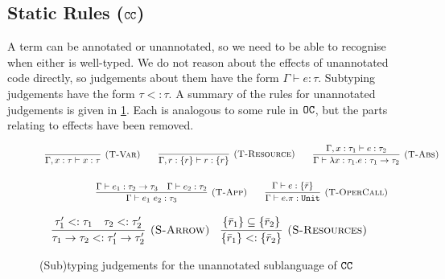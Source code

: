 \subsection{Static Rules ($\mathtt{CC}$)}

A term can be annotated or unannotated, so we need to be able to recognise when either is well-typed. We do not reason about the effects of unannotated code directly, so judgements about them have the form $\Gamma \vdash e: \tau$. Subtyping judgements have the form $\tau <: \tau$. A summary of the rules for unannotated judgements is given in \ref{fig:unannotated_static_rules}. Each is analogous to some rule in $\mathtt{OC}$, but the parts relating to effects have been removed.

\begin{figure}[h]
\vspace{-5pt}



\[
\begin{array}{c}


\infer[\textsc{(T-Var)}]
	{\Gamma, x: \tau \vdash x: \tau}
	{}
~~~~~~
\infer[\textsc{(T-Resource)}]
	{\Gamma, r: \{ r \} \vdash r : \{ r \}}
	{}

~~~~~~
\infer[\textsc{(T-Abs)}]
	{\Gamma \vdash \lambda x: \tau_1.e : \tau_1 \rightarrow \tau_2}
	{\Gamma, x: \tau_1 \vdash e: \tau_2}\\[4ex]
	
\infer[\textsc{(T-App)}]
	{\Gamma \vdash e_1~e_2: \tau_3}
	{\Gamma \vdash e_1: \tau_2 \rightarrow \tau_3 & \Gamma \vdash e_2: \tau_2}
~~~~~~
\infer[\textsc{(T-OperCall)}]
	{\Gamma \vdash e.\pi: \kwa{Unit}}
	{\Gamma \vdash e: \{ \bar r \}}

\end{array}
\]



\fbox{$\tau <: \tau$}

\[
\begin{array}{c}

\infer[\textsc{(S-Arrow)}]
	{ \tau_1 \rightarrow \tau_2 <: \tau_1' \rightarrow \tau_2' }
	{ \tau_1' <: \tau_1 & \tau_2 <: \tau_2' }
	~~~
\infer[\textsc{(S-Resources)}]
	{ \{ \bar r_1 \} <: \{ \bar r_2 \} }
	{ \{ \bar r_1 \} \subseteq \{ \bar r_2 \} }

\end{array}
\]

\vspace{-7pt}
\caption{(Sub)typing judgements for the unannotated sublanguage of $\mathtt{CC}$}
\label{fig:unannotated_static_rules}
\end{figure}

